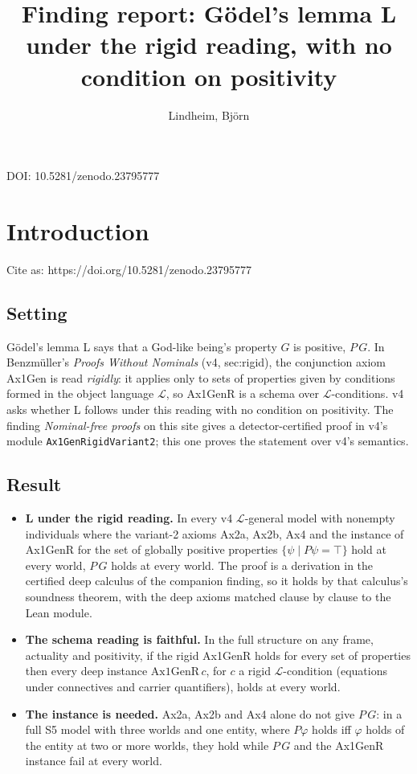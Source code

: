 \documentclass{article}
\title{Finding report: Gödel's lemma L under the rigid reading, with no condition on positivity}
\author{Lindheim, Björn}
\date{}
\begin{document}
\maketitle
\begin{center}DOI: 10.5281/zenodo.23795777\end{center}
\section{Introduction}
\label{sec:ontological-rigid-l}

Cite as: https://doi.org/10.5281/zenodo.23795777

\subsection*{Setting}

Gödel's lemma L says that a God-like being's property $G$ is positive, $P\,G$. In
Benzmüller's \emph{Proofs Without Nominals} \cite{benzmueller2026nominals} (v4, sec:rigid), the
conjunction axiom Ax1Gen is read \emph{rigidly}: it applies only to sets of properties given by
conditions formed in the object language $\mathcal L$, so Ax1GenR is a schema over
$\mathcal L$-conditions. v4 asks whether L follows under this reading with no condition on
positivity. The finding \emph{Nominal-free proofs} on this site gives a detector-certified proof in
v4's module \texttt{Ax1GenRigidVariant2}; this one proves the statement over v4's semantics.

\subsection*{Result}

\begin{itemize}
\item \textbf{L under the rigid reading.} In every v4 $\mathcal L$-general model with nonempty individuals where the variant-2 axioms Ax2a, Ax2b, Ax4 and the instance of Ax1GenR for the set of globally positive properties $\{\psi \mid P\psi=\top\}$ hold at every world, $P\,G$ holds at every world. The proof is a derivation in the certified deep calculus of the companion finding, so it holds by that calculus's soundness theorem, with the deep axioms matched clause by clause to the Lean module.
\item \textbf{The schema reading is faithful.} In the full structure on any frame, actuality and positivity, if the rigid Ax1GenR holds for every set of properties then every deep instance $\mathrm{Ax1GenR}\,c$, for $c$ a rigid $\mathcal L$-condition (equations under connectives and carrier quantifiers), holds at every world.
\item \textbf{The instance is needed.} Ax2a, Ax2b and Ax4 alone do not give $P\,G$: in a full S5 model with three worlds and one entity, where $P\varphi$ holds iff $\varphi$ holds of the entity at two or more worlds, they hold while $P\,G$ and the Ax1GenR instance fail at every world.
\end{itemize}
\end{document}
